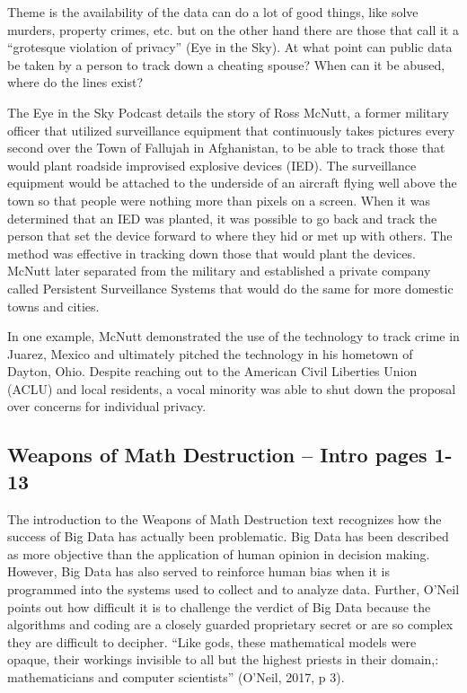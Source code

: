 \documentclass[]{book}
\begin{document}
Theme is the availability of the data can do a lot of good things, like solve murders, property crimes, etc. but on the other hand there are those that call it a ``grotesque violation of privacy'' (Eye in the Sky). At what point can public data be taken by a person to track down a cheating spouse? When can it be abused, where do the lines exist?

The Eye in the Sky Podcast details the story of Ross McNutt, a former military officer that utilized surveillance equipment that continuously takes pictures every second over the Town of Fallujah in Afghanistan, to be able to track those that would plant roadside improvised explosive devices (IED). The surveillance equipment would be attached to the underside of an aircraft flying well above the town so that people were nothing more than pixels on a screen. When it was determined that an IED was planted, it was possible to go back and track the person that set the device forward to where they hid or met up with others. The method was effective in tracking down those that would plant the devices. McNutt later separated from the military and established a private company called Persistent Surveillance Systems that would do the same for more domestic towns and cities.

In one example, McNutt demonstrated the use of the technology to track crime in Juarez, Mexico and ultimately pitched the technology in his hometown of Dayton, Ohio. Despite reaching out to the American Civil Liberties Union (ACLU) and local residents, a vocal minority was able to shut down the proposal over concerns for individual privacy.

\hypertarget{weapons-of-math-destruction-intro-pages-1-13}{%
\subsection{Weapons of Math Destruction -- Intro pages 1-13}\label{weapons-of-math-destruction-intro-pages-1-13}}

The introduction to the Weapons of Math Destruction text recognizes how the success of Big Data has actually been problematic. Big Data has been described as more objective than the application of human opinion in decision making. However, Big Data has also served to reinforce human bias when it is programmed into the systems used to collect and to analyze data. Further, O'Neil points out how difficult it is to challenge the verdict of Big Data because the algorithms and coding are a closely guarded proprietary secret or are so complex they are difficult to decipher. ``Like gods, these mathematical models were opaque, their workings invisible to all but the highest priests in their domain,: mathematicians and computer scientists'' (O'Neil, 2017, p 3).
\end{document}
